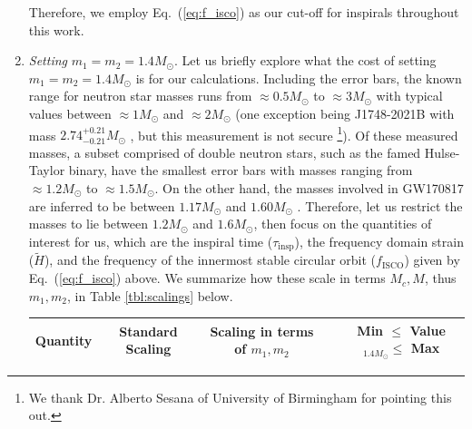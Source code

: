 \documentclass[prd,amsmath,amssymb,aps,floats,amsfonts,notitlepage,superscriptaddress,eqsecnum,nofootinbib,10pt]{revtex4-1}
\newcommand\T{\rule{0pt}{2.6ex}}       %
\newcommand\B{\rule[-1.2ex]{0pt}{0pt}} %
\begin{document}
\begin{enumerate}
Therefore, we employ Eq.~(\ref{eq:f_isco}) as our cut-off for
inspirals throughout this work.
%
\item {\it Setting} $m_1=m_2=1.4 M_\odot$.
Let us briefly explore what the cost of setting $m_1=m_2=1.4 M_\odot$ is for our calculations. 
Including the error bars, the known range for neutron star masses runs from $\approx 0.5 M_\odot$ to $ \approx 3 M_\odot$ with typical values between $\approx 1 M_\odot$ and $\approx 2 M_\odot$ \cite{Ozel_Freire} (one exception being J1748-2021B with mass $2.74^{+0.21}_{-0.21} M_\odot $ \cite{Freire_et_al_2007}, but this measurement is not secure \cite{Lattimer:2012nd}\footnote{We thank Dr. Alberto Sesana of University of Birmingham for pointing this out.}).
Of these measured masses, a subset comprised of double neutron stars, such as the famed Hulse-Taylor binary, have the smallest error bars with masses
ranging from $\approx 1.2 M_\odot$ to $\approx 1.5 M_\odot$. 
On the other hand, the masses involved in GW170817 are inferred to be between $1.17 M_\odot$ and $1.60 M_\odot$ \cite{GW170817}.
Therefore, let us restrict the masses to lie between $1.2 M_\odot$ and $1.6 M_\odot$, then focus on %
the quantities of interest for us, which are %
the inspiral time ($\tau_\text{insp}$), the frequency domain strain ($\tilde{H}$), and
the frequency of the innermost stable circular orbit ($f_\text{ISCO}$) given by Eq.~(\ref{eq:f_isco}) above.
We summarize how these scale in terms $M_c, M$, thus $m_1, m_2$, in Table \ref{tbl:scalings} below.
%
\begin{center}
\begin{table}[ht]
\begin{tabular}{lcccc}
\hline\hline
 Quantity\hspace{5mm} & Standard Scaling & \hspace{3mm}Scaling in terms of $m_1,m_2$ & &\hspace{0.5cm} Min $\le$ Value$_{1.4M_\odot} \le$ Max\T\B\\
\hline

\end{tabular}
\end{table}
\end{center}
\end{enumerate}
\end{document}
